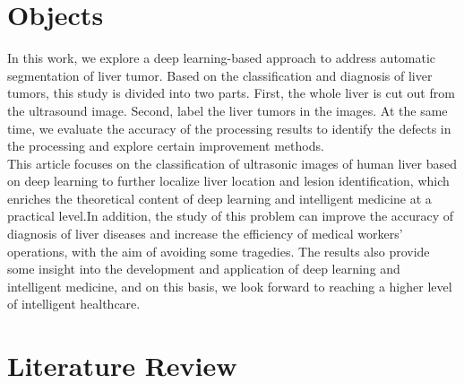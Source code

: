 \documentclass[12pt, a4paper]{article}
\begin{document}
\section{Objects} 

\setlength{\parindent}{1em}
In this work, we explore a deep learning-based approach to address automatic segmentation of liver tumor. Based on the classification and diagnosis of liver tumors, this study is divided into two parts. First, the whole liver is cut out from the ultrasound image. Second, label the liver tumors in the images. At the same time, we evaluate the accuracy of the processing results to identify the defects in the processing and explore certain improvement methods.\\

\setlength{\parindent}{1em}
This article focuses on the classification of ultrasonic images of human liver based on deep learning to further localize liver location and lesion identification, which enriches the theoretical content of deep learning and intelligent medicine at a practical level.In addition, the study of this problem can improve the accuracy of diagnosis of liver diseases and increase the efficiency of medical workers' operations, with the aim of avoiding some tragedies. The results also provide some insight into the development and application of deep learning and intelligent medicine, and on this basis, we look forward to reaching a higher level of intelligent healthcare.



\section{Literature Review}
\end{document}
